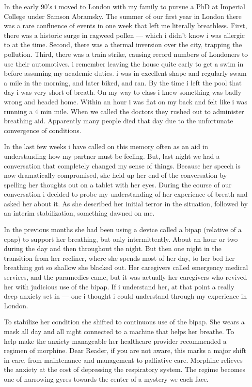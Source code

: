 In the early 90's i moved to London with my family to pursue a PhD at Imperial College under Samson Abramsky. The summer of our first year in London there was a rare confluence of events in one week that left me literally breathless. First, there was a historic surge in ragweed pollen --- which i didn't know i was allergic to at the time. Second, there was a thermal inversion over the city, trapping the pollution. Third, there was a train strike, causing record numbers of Londoners to use their automotives. i remember leaving the house quite early to get a swim in before assuming my academic duties. i was in excellent shape and regularly swam a mile in the morning, and later biked, and ran. By the time i left the pool that day i was very short of breath. On my way to class i knew something was badly wrong and headed home. Within an hour i was flat on my back and felt like i was running a 4 min mile. When we called the doctors they rushed out to administer breathing aid. Apparently many people died that day due to the unfortunate convergence of conditions.  

In the last few weeks i have called on this memory often as an aid in understanding how my partner must be feeling. But, last night we had a conversation that completely changed my sense of things. Because her speech is now dramatically compromised, she held up her end of the conversation by spelling her thoughts out on a tablet with her eyes. During the course of our conversation i decided to probe my understanding of her experience of breath and asked her about it. As she described her initial terror in the situation, followed by an interim stabilization, something dawned on me. 

In the previous months she had been using a device called a bipap (relative of a cpap) to support her breathing, but only intermittently. About an hour or two during the day and then throughout the night. But then one night in the transition from her recliner, where she spends most of her day, to her bed her breathing got so shallow she blacked out. Her caregivers called emergency medical services, and the paramedics came, but it was actually her caregivers who revived her with judicious use of the bipap. If i understand her, at that point a really deep anxiety set in --- one i thought i could understand through my experience in London. 

To stabilize her condition she shifted to continuous use of the bipap. She wears a mask all day and all night connected to a machine that helps her breathe. To help make the anxiety manageable her healthcare provider recommended a regimen of morphine. Dear Reader, if you are not aware, this marks a major shift in care, from maintenance and management to palliative care. Morphine relieves the anxiety at the cost of depressing the respiratory system. The regime becomes one of narrowing gyres towards the center of a mystery we each face. 

